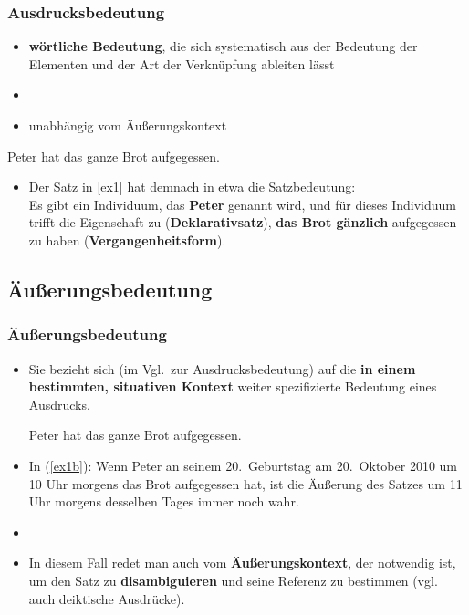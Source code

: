 \begin{frame}
	\frametitle{Ausdrucksbedeutung}


	\begin{itemize}
		\item \textbf{wörtliche Bedeutung}, die sich systematisch aus der Bedeutung der Elementen und der Art der Verknüpfung ableiten lässt
		\item[]
		\item unabhängig vom Äußerungskontext
	\end{itemize} 

\pause 

	\ea \label{ex1}Peter hat das ganze Brot aufgegessen.
	\z

\begin{itemize}
	\item Der Satz in \ref{ex1} hat demnach in etwa die Satzbedeutung:\\
	Es gibt ein Individuum, das \textbf{Peter} genannt wird,
	und für dieses Individuum trifft die Eigenschaft zu (\textbf{Deklarativsatz}),
	\textbf{das Brot gänzlich} aufgegessen zu haben (\textbf{Vergangenheitsform}).
\end{itemize}

\end{frame}


%
\subsection{Äußerungsbedeutung}
%

\begin{frame}
\frametitle{Äußerungsbedeutung}

\begin{itemize}
	\item Sie bezieht sich (im Vgl.\ zur Ausdrucksbedeutung) auf die \textbf{in einem bestimmten, situativen Kontext} weiter spezifizierte Bedeutung eines Ausdrucks.

\pause 
	
	\ea \label{ex1b}Peter hat das ganze Brot aufgegessen.
	\z

	\item In (\ref{ex1b}): Wenn Peter an seinem 20.\ Geburtstag am 20.\ Oktober 2010 um 10 Uhr morgens das Brot aufgegessen hat, ist die Äußerung des Satzes um 11 Uhr morgens desselben Tages immer noch wahr.
	\item[]
	\item In diesem Fall redet man auch vom \textbf{Äußerungskontext}, der notwendig ist, um den Satz zu \textbf{disambiguieren} und seine Referenz zu bestimmen (vgl. auch deiktische Ausdrücke).
	
\end{itemize}

\end{frame}


